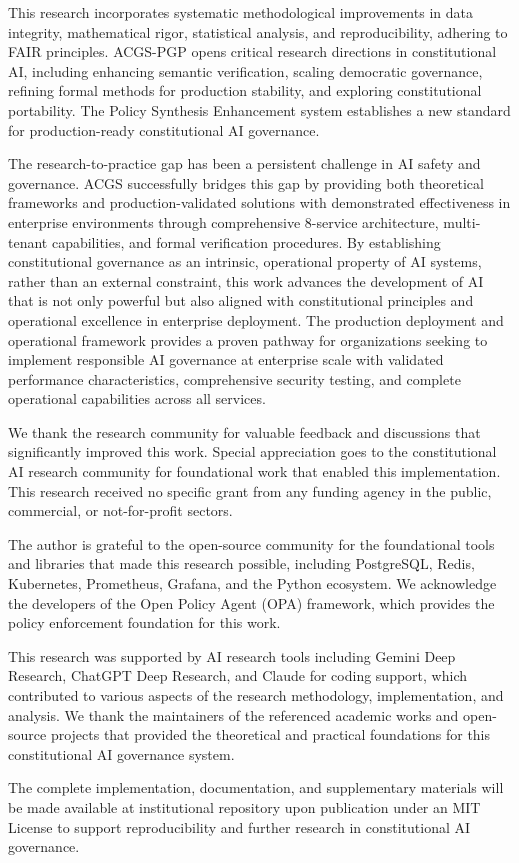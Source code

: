 \documentclass[manuscript,screen,9pt]{acmart}
\begin{document}
This research incorporates systematic methodological improvements in data integrity, mathematical rigor, statistical analysis, and reproducibility, adhering to FAIR principles. ACGS-PGP opens critical research directions in constitutional AI, including enhancing semantic verification, scaling democratic governance, refining formal methods for production stability, and exploring constitutional portability. The Policy Synthesis Enhancement system establishes a new standard for production-ready constitutional AI governance.

The research-to-practice gap has been a persistent challenge in AI safety and governance. ACGS successfully bridges this gap by providing both theoretical frameworks and production-validated solutions with demonstrated effectiveness in enterprise environments through comprehensive 8-service architecture, multi-tenant capabilities, and formal verification procedures. By establishing constitutional governance as an intrinsic, operational property of AI systems, rather than an external constraint, this work advances the development of AI that is not only powerful but also aligned with constitutional principles and operational excellence in enterprise deployment. The production deployment and operational framework provides a proven pathway for organizations seeking to implement responsible AI governance at enterprise scale with validated performance characteristics, comprehensive security testing, and complete operational capabilities across all services.

\begin{acks}
We thank the research community for valuable feedback and discussions that significantly improved this work. Special appreciation goes to the constitutional AI research community for foundational work that enabled this implementation. This research received no specific grant from any funding agency in the public, commercial, or not-for-profit sectors.

The author is grateful to the open-source community for the foundational tools and libraries that made this research possible, including PostgreSQL, Redis, Kubernetes, Prometheus, Grafana, and the Python ecosystem. We acknowledge the developers of the Open Policy Agent (OPA) framework, which provides the policy enforcement foundation for this work.

This research was supported by AI research tools including Gemini Deep Research, ChatGPT Deep Research, and Claude for coding support, which contributed to various aspects of the research methodology, implementation, and analysis. We thank the maintainers of the referenced academic works and open-source projects that provided the theoretical and practical foundations for this constitutional AI governance system.

The complete implementation, documentation, and supplementary materials will be made available at institutional repository upon publication under an MIT License to support reproducibility and further research in constitutional AI governance.
\end{acks}
\end{document}

